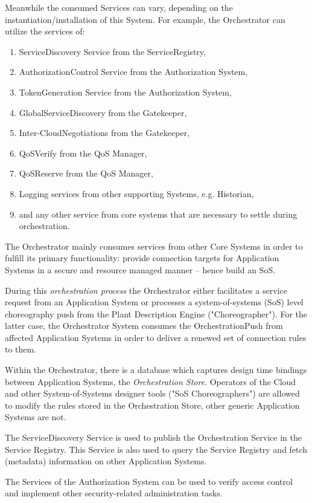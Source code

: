 \documentclass[a4paper]{arrowhead}
\begin{document}
Meanwhile the consumed Services can vary, depending on the instantiation/installation of this System. For example, the Orchestrator can utilize the services of: 
\begin{enumerate}
	\item ServiceDiscovery Service from the ServiceRegistry,
	\item AuthorizationControl Service from the Authorization System,
	\item TokenGeneration Service from the Authorization System,
	\item GlobalServiceDiscovery from the Gatekeeper,
	\item Inter-CloudNegotiations from the Gatekeeper,
	\item QoSVerify from the QoS Manager,
	\item QoSReserve from the QoS Manager,
	\item Logging services from other supporting Systems, e.g. Historian,
	\item and any other service from core systems that are necessary to settle during orchestration.  
\end{enumerate}

The Orchestrator mainly consumes services from other Core Systems in order to fulfill its primary functionality: provide connection targets for Application Systems in a secure and resource managed manner -- hence build an SoS. 

During this \emph{orchestration process} the Orchestrator either facilitates a service request from an Application System or processes a system-of-systems (SoS) level choreography push from the Plant Description Engine ("Choreographer"). For the latter case, the Orchestrator System consumes the OrchestrationPush from affected Application Systems in order to deliver a renewed set of connection rules to them. 

Within the Orchestrator, there is a database which captures design time bindings between Application Systems, the \emph{Orchestration Store}. Operators of the Cloud and other System-of-Systems designer tools ("SoS Choreographers") are allowed to modify the rules stored in the Orchestration Store, other generic Application Systems are not.

The ServiceDiscovery Service is used to publish the Orchestration Service in the Service Registry. This Service is also used to query the Service Registry and fetch (metadata) information on other Application Systems.

The Services of the Authorization System can be used to verify access control and implement other security-related administration tasks. 
\end{document}
